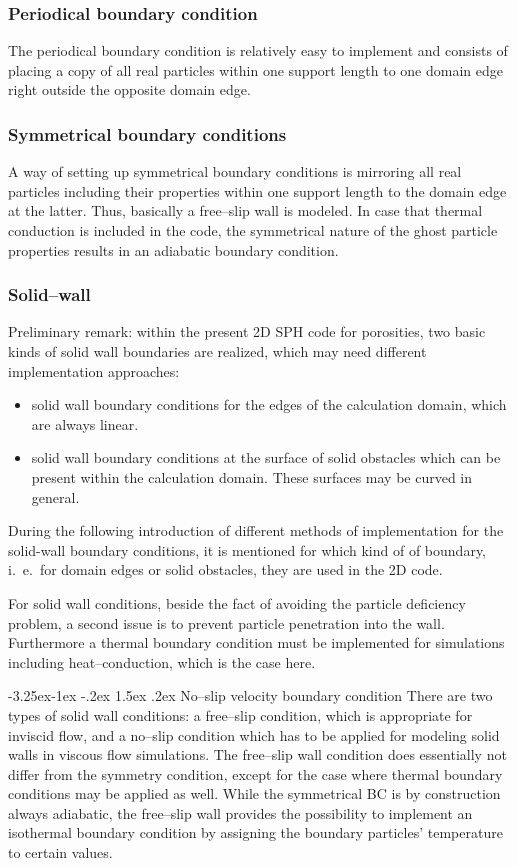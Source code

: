 \documentclass[11pt,a4paper,twoside]{report}
\makeatletter
\renewcommand\paragraph{\@startsection{paragraph}{4}{\z@}%
  {-3.25ex\@plus -1ex \@minus -.2ex}%
  {1.5ex \@plus .2ex}%
  {\normalfont\normalsize\bfseries}}
\makeatother
\begin{document}
\subsubsection{Periodical boundary condition}
The periodical boundary condition is relatively easy to implement and consists of placing a copy of all real particles within one support length to one domain edge right outside the opposite domain edge.


\subsubsection{Symmetrical boundary conditions}
A way of setting up symmetrical boundary conditions is mirroring all real particles including their properties within one support length to the domain edge at the latter. Thus, basically a free--slip wall is modeled. In case that thermal conduction is included in the code, the symmetrical nature of the ghost particle properties results in an adiabatic boundary condition.

\subsubsection{Solid--wall}
\label{sec:boundaryCond_solidWall}
Preliminary remark: within the present 2D SPH code for porosities, two basic kinds of solid wall boundaries are realized, which may need different implementation approaches:
\begin{itemize}
 \item solid wall boundary conditions for the edges of the calculation domain, which are always linear.
\item solid wall boundary conditions at the surface of solid obstacles which can be present within the calculation domain. These surfaces may be curved in general. 
\end{itemize}
During the following introduction of different methods of implementation for the solid-wall boundary conditions, it is mentioned for which kind of of boundary, i.\ e.\ for domain edges or solid obstacles, they are used in the 2D code. 

For solid wall conditions, beside the fact of avoiding the particle deficiency problem, a second issue is to prevent particle penetration into the wall.
Furthermore a thermal boundary condition must be implemented for simulations including heat--conduction, which is the case here.

\paragraph{No--slip velocity boundary condition}
There are two types of solid wall conditions: a free--slip condition, which is appropriate for inviscid flow, and a no--slip condition which has to be applied for modeling solid walls in viscous flow simulations. The free--slip wall condition does essentially not differ from the symmetry condition, except for the case where thermal boundary conditions may be applied as well. While the symmetrical BC is by construction always adiabatic, the free--slip wall provides the possibility to implement an isothermal boundary condition by assigning the boundary particles' temperature to certain values.
\end{document}
